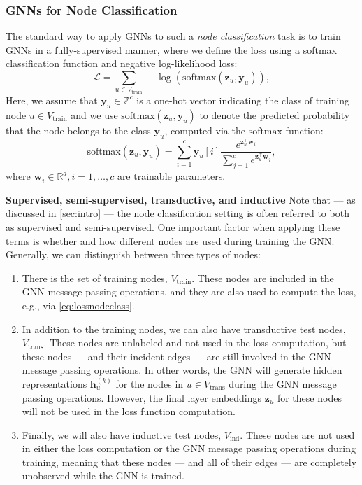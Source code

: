 \documentclass[10pt]{book}
\let\defaultmarginpar\marginpar
\renewcommand\marginpar[2][]{\defaultmarginpar{\itshape\color{gray}#2}}
\begin{document}
\subsubsection{GNNs for Node Classification}

The standard way to apply GNNs to such a \emph{node classification}\marginpar{node classification} task is to train GNNs in a fully-supervised manner, where we define the loss using a softmax classification function and negative log-likelihood loss:
\begin{equation}
    \mathcal L = \sum_{u \in V_\text{train}} -\log(\text{softmax}(\mathbf z_u, \mathbf y_u)),
    \label{eq:lossnodeclass}
\end{equation}
Here, we assume that $\mathbf y_u \in \mathbb Z^c$ is a one-hot vector indicating the class of training node $u \in V_\text{train}$ and we use $\text{softmax}(\mathbf z_u, \mathbf y_u)$ to denote the predicted probability that the node belongs to the class $\mathbf y_u$, computed via the $\text{softmax}$ function:
\begin{equation}
    \text{softmax}(\mathbf z_u, \mathbf y_u) = \sum^c_{i=1} \mathbf y_u[i] \frac{e^{\mathbf z_u^\top \mathbf w_i}}{\sum^c_{j=1} e^{\mathbf z_u^\top \mathbf w_j}},
\end{equation}
where $\mathbf w_i \in \mathbb R^d, i = 1, \ldots, c$ are trainable parameters.

\textbf{Supervised, semi-supervised, transductive, and inductive} Note
that --- as discussed in \autoref{sec:intro} --- the node classification setting is often referred to both as supervised and semi-supervised. One important factor when applying these terms is whether and how different nodes are used during training the GNN. Generally, we can distinguish between three types of nodes:
\begin{enumerate}
    \item There is the set of training nodes, $V_\text{train}$. These nodes are included in the GNN message passing operations, and they are also used to compute the loss, e.g., via \autoref{eq:lossnodeclass}.

    \item In addition to the training nodes, we can also have transductive test nodes, $V_\text{trans}$. These nodes are unlabeled and not used in the loss computation, but these nodes --- and their incident edges --- are still involved in the GNN message passing operations. In other words, the GNN will generate hidden representations $\mathbf h_u^{(k)}$ for the nodes in $u \in V_\text{trans}$ during the GNN message passing operations. However, the final layer embeddings $\mathbf z_u$ for these nodes will not be used in the loss function computation.
    
    \item  Finally, we will also have inductive test nodes, $V_\text{ind}$. These nodes are not used in either the loss computation or the GNN message passing operations during training, meaning that these nodes --- and all of their edges --- are completely unobserved while the GNN is trained.
\end{enumerate}
\end{document}
